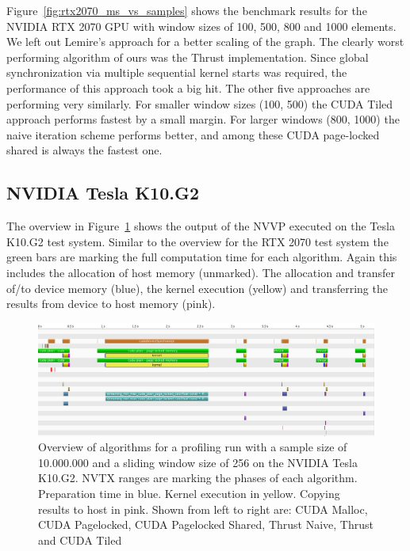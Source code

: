 Figure~\ref{fig:rtx2070_ms_vs_samples} shows the benchmark results for the NVIDIA RTX 2070 GPU with window sizes of 100, 500, 800 and 1000 elements. We left out Lemire's approach for a better scaling of the graph. The clearly worst performing algorithm of ours was the Thrust implementation. Since global synchronization via multiple sequential kernel starts was required, the performance of this approach took a big hit. The other five approaches are performing very similarly. For smaller window sizes (100, 500) the CUDA Tiled approach performs fastest by a small margin. For larger windows (800, 1000) the naive iteration scheme performs better, and among these CUDA page-locked shared is always the fastest one.



\subsection{NVIDIA Tesla K10.G2}

The overview in Figure~\ref{fig:group_picture_tesla_k10g2} shows the output of the NVVP executed on the Tesla K10.G2 test system. Similar to the overview for the RTX 2070 test system the green bars are marking the full computation time for each algorithm. Again this includes the allocation of host memory (unmarked). The allocation and transfer of/to device memory (blue), the kernel execution (yellow) and transferring the results from device to host memory (pink).

\begin{figure}
    \centering
    \includegraphics[width=1.0\linewidth]{Figures/group_picture_tesla_k10g2}
    \caption{Overview of algorithms for a profiling run with a sample size of 10.000.000 and a sliding window size of 256 on the NVIDIA Tesla K10.G2. NVTX ranges are marking the phases of each algorithm. Preparation time in blue. Kernel execution in yellow. Copying results to host in pink. Shown from left to right are: CUDA Malloc, CUDA Pagelocked, CUDA Pagelocked Shared, Thrust Naive, Thrust and CUDA Tiled}
    \label{fig:group_picture_tesla_k10g2}
\end{figure}

